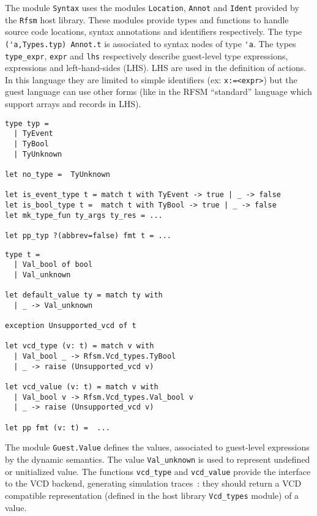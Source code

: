 The module \texttt{Syntax} uses the modules \texttt{Location}, \texttt{Annot}  and \texttt{Ident}
provided by the \texttt{Rfsm} host library. These modules provide types and functions to handle
source code locations, syntax annotations and identifiers respectively. The type
\verb|('a,Types.typ) Annot.t| is associated to syntax nodes of type
\verb|'a|. The types \verb|type_expr|, \verb|expr| and \verb|lhs| respectively describe guest-level
type expressions, expressions and left-hand-sides (LHS). LHS are used in the definition of
actions. In this language they are limited to simple identifiers (ex: \verb|x:=<expr>|) but the
guest language can use other forms (like in the RFSM ``standard'' language which support arrays and
records in LHS). 

\begin{lstlisting}[language={[Objective]Caml},frame=single,basicstyle=\small,caption={Module
    \texttt{Guest.Values} (excerpt)},label={lst:mini-value}]
type typ =
  | TyEvent
  | TyBool
  | TyUnknown

let no_type =  TyUnknown

let is_event_type t = match t with TyEvent -> true | _ -> false
let is_bool_type t =  match t with TyBool -> true | _ -> false
let mk_type_fun ty_args ty_res = ...

let pp_typ ?(abbrev=false) fmt t = ...
\end{lstlisting}

\begin{lstlisting}[language={[Objective]Caml},frame=single,basicstyle=\small,caption={Module
    \texttt{Guest.Value} (excerpt)},label={lst:mini-value}]
type t =
  | Val_bool of bool
  | Val_unknown

let default_value ty = match ty with
  | _ -> Val_unknown

exception Unsupported_vcd of t

let vcd_type (v: t) = match v with
  | Val_bool _ -> Rfsm.Vcd_types.TyBool
  | _ -> raise (Unsupported_vcd v)

let vcd_value (v: t) = match v with
  | Val_bool v -> Rfsm.Vcd_types.Val_bool v
  | _ -> raise (Unsupported_vcd v)

let pp fmt (v: t) =  ...
\end{lstlisting}

The module \verb|Guest.Value| defines the values, associated to guest-level expressions by the
dynamic semantics. The value \verb|Val_unknown| is used to represent undefined or unitialized
value. The functions \verb|vcd_type| and \verb|vcd_value| provide the interface to the VCD backend,
generating simulation traces~: they should return a VCD compatible representation  (defined in the
host library \verb|Vcd_types| module) of a value.

